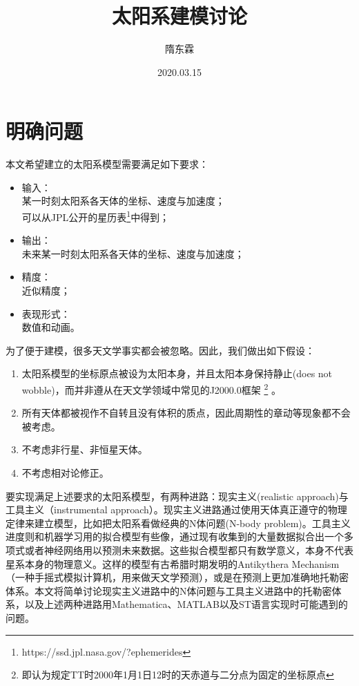 \documentclass{ctexart}
\title{太阳系建模讨论}
\author{隋东霖}
\date{2020.03.15}
\theoremstyle{definition}
\begin{document}
\maketitle

\section{明确问题}
\label{sec:Introduction}
    本文希望建立的太阳系模型需要满足如下要求：
    \begin{itemize}
        \item 输入：\\
        某一时刻太阳系各天体的坐标、速度与加速度；\\
        可以从JPL公开的星历表\footnote{https://ssd.jpl.nasa.gov/?ephemerides}中得到；
        \item 输出：\\
        未来某一时刻太阳系各天体的坐标、速度与加速度；
        \item 精度：\\
        近似精度；
        \item 表现形式：\\
        数值和动画。
    \end{itemize}
    
    为了便于建模，很多天文学事实都会被忽略。因此，我们做出如下假设：
    \begin{enumerate}
        \item 太阳系模型的坐标原点被设为太阳本身，并且太阳本身保持静止(does not wobble)，而并非遵从在天文学领域中常见的J2000.0框架 \footnote{即认为规定TT时2000年1月1日12时的天赤道与二分点为固定的坐标原点} 。
        \item 所有天体都被视作不自转且没有体积的质点，因此周期性的章动等现象都不会被考虑。
        \item 不考虑非行星、非恒星天体。
        \item 不考虑相对论修正。
    \end{enumerate}
    
    要实现满足上述要求的太阳系模型，有两种进路：现实主义(realistic approach)与工具主义（instrumental approach）。现实主义进路通过使用天体真正遵守的物理定律来建立模型，比如把太阳系看做经典的N体问题(N-body problem)。工具主义进度则和机器学习用的拟合模型有些像，通过现有收集到的大量数据拟合出一个多项式或者神经网络用以预测未来数据。这些拟合模型都只有数学意义，本身不代表星系本身的物理意义。这样的模型有古希腊时期发明的Antikythera Mechanism（一种手摇式模拟计算机，用来做天文学预测），或是在预测上更加准确地托勒密体系。本文将简单讨论现实主义进路中的N体问题与工具主义进路中的托勒密体系，以及上述两种进路用Mathematica、MATLAB以及ST语言实现时可能遇到的问题。
    
\end{document}

